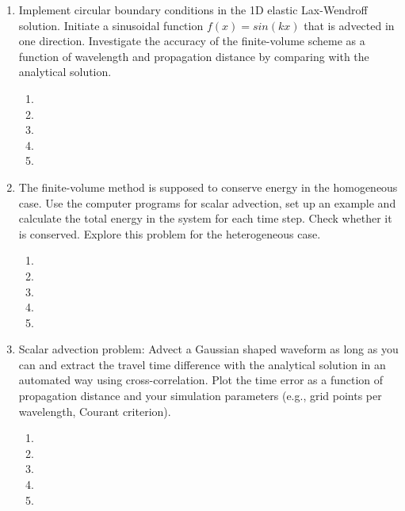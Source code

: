 \begin{enumerate}
\item
Implement circular boundary conditions in the 1D elastic Lax-Wendroff solution. Initiate a sinusoidal function $f(x)=sin(kx)$ that is advected in one direction. Investigate the accuracy of the finite-volume scheme as a function of wavelength and propagation distance by comparing with the analytical solution.   
\begin{enumerate}
\item[]
\item[]
\item[] 
\item[]
\item[] 
\end{enumerate}
\item
The finite-volume method is supposed to conserve energy in the homogeneous case. Use the computer programs for scalar advection, set up an example and calculate the total energy in the system for each time step. Check whether it is conserved. Explore this problem for the heterogeneous case.   
\begin{enumerate}
\item[]
\item[]
\item[] 
\item[]
\item[] 
\end{enumerate}
\item
Scalar advection problem: Advect a Gaussian shaped waveform as long as you can and extract the travel time difference with the analytical solution in an automated way using cross-correlation. Plot the time error as a function of propagation distance and your simulation parameters (e.g., grid points per wavelength, Courant criterion). 
\begin{enumerate}
\item[]
\item[]
\item[] 
\item[]
\item[] 
\end{enumerate} 
\end{enumerate}